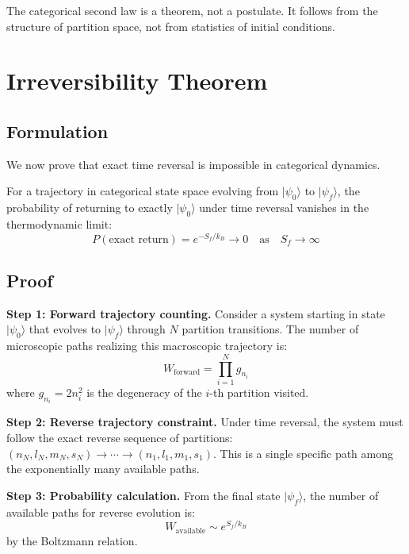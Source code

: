 The categorical second law is a theorem, not a postulate. It follows from the structure of partition space, not from statistics of initial conditions.

\section{Irreversibility Theorem}
\label{sec:irreversibility}

\subsection{Formulation}

We now prove that exact time reversal is impossible in categorical dynamics.

\begin{theorem}
\label{thm:irreversibility}
For a trajectory in categorical state space evolving from $|\psi_0\rangle$ to $|\psi_f\rangle$, the probability of returning to exactly $|\psi_0\rangle$ under time reversal vanishes in the thermodynamic limit:
\begin{equation}
    P(\text{exact return}) = e^{-S_f/k_B} \to 0 \quad \text{as} \quad S_f \to \infty
\end{equation}
\end{theorem}

\subsection{Proof}

\textbf{Step 1: Forward trajectory counting.}
Consider a system starting in state $|\psi_0\rangle$ that evolves to $|\psi_f\rangle$ through $N$ partition transitions. The number of microscopic paths realizing this macroscopic trajectory is:
\begin{equation}
    W_{\text{forward}} = \prod_{i=1}^{N} g_{n_i}
\end{equation}
where $g_{n_i} = 2n_i^2$ is the degeneracy of the $i$-th partition visited.

\textbf{Step 2: Reverse trajectory constraint.}
Under time reversal, the system must follow the exact reverse sequence of partitions: $(n_N, l_N, m_N, s_N) \to \cdots \to (n_1, l_1, m_1, s_1)$. This is a single specific path among the exponentially many available paths.

\textbf{Step 3: Probability calculation.}
From the final state $|\psi_f\rangle$, the number of available paths for reverse evolution is:
\begin{equation}
    W_{\text{available}} \sim e^{S_f/k_B}
\end{equation}
by the Boltzmann relation.


